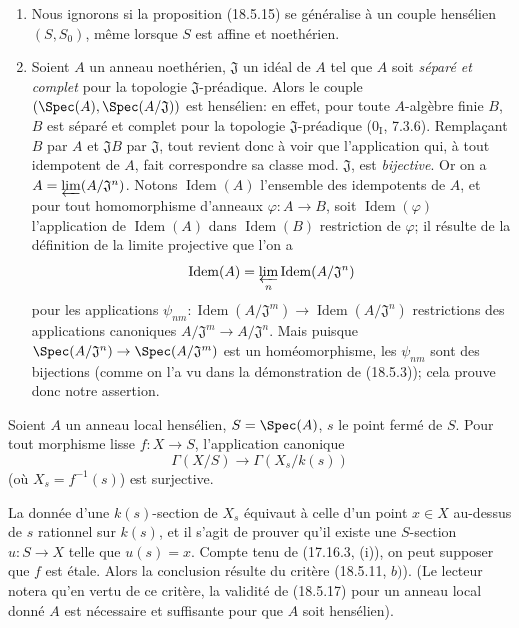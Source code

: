 \begin{remarks}[18.5.16]
\label{IV.18.5.16}
\begin{enumerate}
  \item[(i)] Nous ignorons si la proposition (18.5.15) se généralise à un couple hensélien $(S,S_0)$, même lorsque $S$ est affine et noethérien.
  \item[(ii)] Soient $A$ un anneau noethérien, $\mathfrak J$ un idéal de $A$ tel que $A$ soit \emph{séparé et complet} pour la topologie $\mathfrak J$-préadique. Alors le couple $(\Spec(A),\Spec(A/\mathfrak J))$ est hensélien: en effet, pour toute $A$-algèbre finie $B$, $B$ est séparé et complet pour la topologie $\mathfrak J$-préadique ($0_{\mathrm I}$, 7.3.6). Remplaçant $B$ par $A$ et $\mathfrak J B$ par $\mathfrak J$, tout revient donc à voir que l'application qui, à tout idempotent de $A$, fait correspondre sa classe mod. $\mathfrak J$, est \emph{bijective}. Or on a $A=\varprojlim (A/\mathfrak J^n)$. Notons $\operatorname{Idem}(A)$ l'ensemble des idempotents de $A$, et pour tout homomorphisme d'anneaux $\varphi:A\to B$, soit $\operatorname{Idem}(\varphi)$ l'application de $\operatorname{Idem}(A)$ dans $\operatorname{Idem}(B)$ restriction de $\varphi$; il résulte de la définition de la limite projective que l'on a
  \[
    \operatorname{Idem}(A)=\varprojlim_n\operatorname{Idem}(A/\mathfrak J^n)
  \]
  pour les applications $\psi_{nm}:\operatorname{Idem}(A/\mathfrak J^m)\to\operatorname{Idem}(A/\mathfrak J^n)$ restrictions des applications canoniques $A/\mathfrak J^m\to A/\mathfrak J^n$. Mais puisque $\Spec(A/\mathfrak J^n)\to\Spec(A/\mathfrak J^m)$ est un homéomorphisme, les $\psi_{nm}$ sont des bijections (comme on l'a vu dans la démonstration de (18.5.3)); cela prouve donc notre assertion.
\end{enumerate}
\end{remarks}

\begin{theorem}[18.5.17]
\label{IV.18.5.17}
Soient $A$ un anneau local hensélien, $S=\Spec(A)$, $s$ le point fermé de $S$. Pour tout morphisme lisse $f:X\to S$, l'application canonique
\[
  \Gamma(X/S)\longrightarrow\Gamma(X_s/k(s))
\]
(où $X_s=f^{-1}(s)$) est surjective.
\end{theorem}

La donnée d'une $k(s)$-section de $X_s$ équivaut à celle d'un point $x\in X$ au-dessus de $s$ rationnel sur $k(s)$, et il s'agit de prouver qu'il existe une $S$-section $u:S\to X$ telle que $u(s)=x$. Compte tenu de (17.16.3, (i)), on peut supposer que $f$ est étale. Alors la conclusion résulte du critère (18.5.11, $b)$). (Le lecteur notera qu'en vertu de ce critère, la validité de (18.5.17) pour un anneau local donné $A$ est nécessaire et suffisante pour que $A$ soit hensélien).

